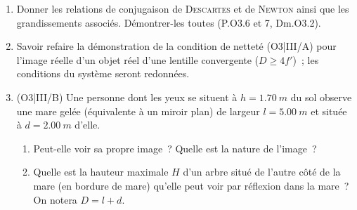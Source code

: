 \documentclass[a4paper, 12pt, final, garamond]{book}
\begin{document}
\begin{enumerate}
	\item Donner les relations de conjugaison de \textsc{Descartes} et de
	      \textsc{Newton} ainsi que les grandissements associés. Démontrer-les
	      toutes (P.O3.6 et 7, Dm.O3.2).


	\item Savoir refaire la démonstration de la condition de netteté (O3|III/A)
	      pour l'image réelle d'un objet réel d'une lentille convergente ($D \geq
		      4f'$)~; les conditions du système seront redonnées.

	\item \leavevmode%
	      (O3|III/B) Une personne dont les yeux se situent à $h = \SI{1.70}{m}$ du
	      sol observe une mare gelée (équivalente à un miroir plan) de largeur $l
		      = \SI{5.00}{m}$ et située à $d = \SI{2.00}{m}$ d'elle.
	      \begin{enumerate}
		      \item Peut-elle voir sa propre image~? Quelle est la nature de
		            l'image~?
		      \item Quelle est la hauteur maximale $H$ d'un arbre situé de l'autre
		            côté de la mare (en bordure de mare) qu'elle peut voir par réflexion
		            dans la mare~? On notera $D = l+d$.
	      \end{enumerate}

\end{enumerate}
\end{document}
